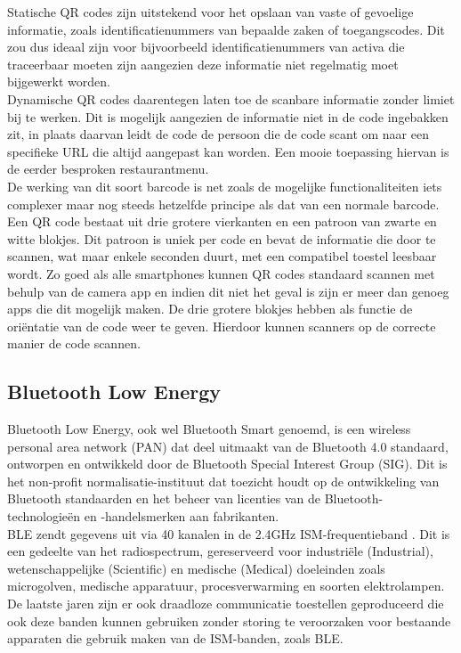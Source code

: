 Statische QR codes zijn uitstekend voor het opslaan van vaste of gevoelige informatie, zoals identificatienummers van bepaalde zaken of toegangscodes. Dit zou dus ideaal zijn voor bijvoorbeeld identificatienummers van activa die traceerbaar moeten zijn aangezien deze informatie niet regelmatig moet bijgewerkt worden. \\

Dynamische QR codes daarentegen laten toe de scanbare informatie zonder limiet bij te werken. Dit is mogelijk aangezien de informatie niet in de code ingebakken zit, in plaats daarvan leidt de code de persoon die de code scant om naar een specifieke URL die altijd aangepast kan worden. Een mooie toepassing hiervan is de eerder besproken restaurantmenu. \\

De werking van dit soort barcode is net zoals de mogelijke functionaliteiten iets complexer maar nog steeds hetzelfde principe als dat van een normale barcode. Een QR code bestaat uit drie grotere vierkanten en een patroon van zwarte en witte blokjes. Dit patroon is uniek per code en bevat de informatie die door te scannen, wat maar enkele seconden duurt, met een compatibel toestel leesbaar wordt. Zo goed als alle smartphones kunnen QR codes standaard scannen met behulp van de camera app en indien dit niet het geval is zijn er meer dan genoeg apps die dit mogelijk maken. De drie grotere blokjes hebben als functie de oriëntatie van de code weer te geven. Hierdoor kunnen scanners op de correcte manier de code scannen.

\subsection{Bluetooth Low Energy}
Bluetooth Low Energy, ook wel Bluetooth Smart genoemd, is een wireless personal area network (PAN) dat deel uitmaakt van de Bluetooth 4.0 standaard, ontworpen en ontwikkeld door de Bluetooth Special Interest Group (SIG). Dit is het non-profit normalisatie-instituut dat toezicht houdt op de ontwikkeling van Bluetooth standaarden en het beheer van licenties van de Bluetooth-technologieën en -handelsmerken aan fabrikanten. \\

BLE zendt gegevens uit via 40 kanalen in de 2.4GHz ISM-frequentieband \autocite{Kumbhar2017}. Dit is een gedeelte van het radiospectrum, gereserveerd voor industriële (Industrial), wetenschappelijke (Scientific) en medische (Medical) doeleinden zoals microgolven, medische apparatuur, procesverwarming en soorten elektrolampen. De laatste jaren zijn er ook draadloze communicatie toestellen geproduceerd die ook deze banden kunnen gebruiken zonder storing te veroorzaken voor bestaande apparaten die gebruik maken van de ISM-banden, zoals BLE.\\


